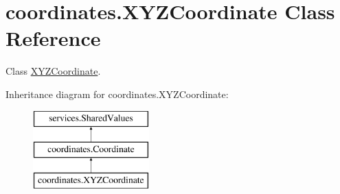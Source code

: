 \hypertarget{classcoordinates_1_1_x_y_z_coordinate}{}\section{coordinates.\+X\+Y\+Z\+Coordinate Class Reference}
\label{classcoordinates_1_1_x_y_z_coordinate}


Class \hyperlink{classcoordinates_1_1_x_y_z_coordinate}{X\+Y\+Z\+Coordinate}.  


Inheritance diagram for coordinates.\+X\+Y\+Z\+Coordinate\+:\begin{figure}[H]
\begin{center}
\leavevmode
\includegraphics[height=3.000000cm]{classcoordinates_1_1_x_y_z_coordinate}
\end{center}
\end{figure}
